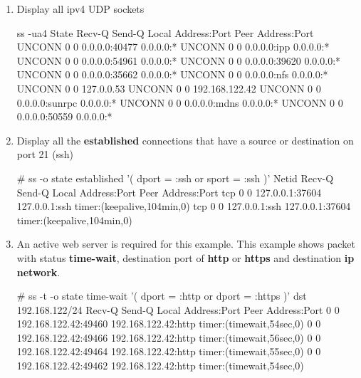 \begin{Lab}
\begin{exe}
\begin{enumerate}
\begin{raw}
			\end{raw}

		
		\item 
		Display all ipv4 UDP sockets
			\begin{raw}
ss -ua4
State  Recv-Q   Send-Q              Local Address:Port       Peer Address:Port  
UNCONN 0        0                         0.0.0.0:40477           0.0.0.0:*     
UNCONN 0        0                         0.0.0.0:ipp             0.0.0.0:*     
UNCONN 0        0                         0.0.0.0:54961           0.0.0.0:*     
UNCONN 0        0                         0.0.0.0:39620           0.0.0.0:*     
UNCONN 0        0                         0.0.0.0:35662           0.0.0.0:*     
UNCONN 0        0                         0.0.0.0:nfs             0.0.0.0:*     
UNCONN 0        0                   127.0.0.53%
UNCONN 0        0           192.168.122.42%
UNCONN 0        0                         0.0.0.0:sunrpc          0.0.0.0:*     
UNCONN 0        0                         0.0.0.0:mdns            0.0.0.0:*     
UNCONN 0        0                         0.0.0.0:50559           0.0.0.0:*     
			\end{raw}

		\item 
		Display all the \textbf{established} connections that have a source 
		or destination on port 21 (ssh) 
			\begin{raw}
# ss -o state established '( dport = :ssh or sport = :ssh )'
Netid  Recv-Q    Send-Q        Local Address:Port        Peer Address:Port                                  
tcp    0         0                 127.0.0.1:37604          127.0.0.1:ssh      timer:(keepalive,104min,0)   
tcp    0         0                 127.0.0.1:ssh            127.0.0.1:37604    timer:(keepalive,104min,0)   
			\end{raw}
				
		\item
		An active web server is required for this example. 
		This example shows packet with status \textbf{time-wait}, destination port of 
		\textbf{http} or \textbf{https} and destination \textbf{ip network}. 
			\begin{raw}

# ss -t -o state time-wait '( dport = :http or dport = :https )' dst 192.168.122/24
Recv-Q  Send-Q       Local Address:Port          Peer Address:Port                               
0       0           192.168.122.42:49460       192.168.122.42:http    timer:(timewait,54sec,0)   
0       0           192.168.122.42:49466       192.168.122.42:http    timer:(timewait,56sec,0)   
0       0           192.168.122.42:49464       192.168.122.42:http    timer:(timewait,55sec,0)   
0       0           192.168.122.42:49462       192.168.122.42:http    timer:(timewait,54sec,0)   
			\end{raw}
		\end{enumerate}
	\end{exe}

\end{Lab}

